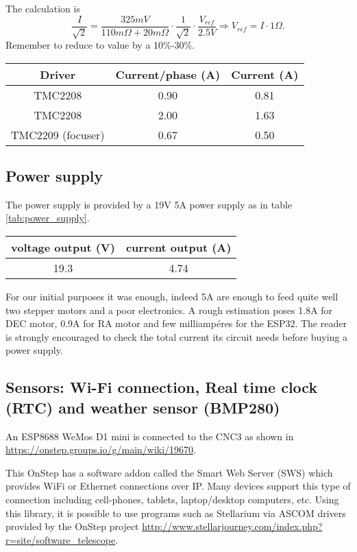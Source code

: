 The calculation is 
\[\frac{I}{\sqrt{2}}=\frac{325mV}{110m\Omega+20m\Omega}\cdot\frac{1}{\sqrt{2}}\cdot\frac{V_{ref}}{2.5V}\Rightarrow V_{ref} = I \cdot 1\Omega.\]
Remember to reduce to value by a 10\%-30\%.

\begin{minipage}
    {.4\textwidth}
    \begin{tabular}{ccc}
       Driver & Current/phase (A) & Current (A) \\
        \hline
       TMC2208 & 0.90 & 0.81 \\
       TMC2208 &  2.00 & 1.63 \\                
       TMC2209 (focuser) &  0.67 & 0.50                
    \end{tabular}
    \label{tab:drivers_curr}
\end{minipage} 

\subsection{Power supply}
The power supply is provided by a 19V 5A power supply as in table \ref{tab:power_supply}.

\begin{minipage}
    {.4\textwidth}
    \begin{tabular}{cc}
         voltage output (V) & current output (A) \\
         \hline
        19.3 & 4.74 \\
    \end{tabular}
    \label{tab:power_supply}
\end{minipage}

For our initial purposes it was enough, indeed 5A are enough to feed quite well two stepper motors and a poor electronics.
A rough estimation poses 1.8A for DEC motor, 0.9A for RA motor and few milliampéres for the ESP32. 
The reader is strongly encouraged to check the total current its circuit needs before buying a power supply.

\subsection{Sensors: Wi-Fi connection, Real time clock (RTC) and weather sensor (BMP280)}
An ESP8688 WeMos D1 mini is connected to the CNC3 as shown in \url{https://onstep.groups.io/g/main/wiki/19670}.

This OnStep has a software addon called the Smart Web Server (SWS) which provides WiFi or Ethernet connections over IP.
Many devices support this type of connection including cell-phones, tablets, laptop/desktop computers, etc.
Using this library, it is possible to use programs such as Stellarium via ASCOM drivers provided by the OnStep project \url{http://www.stellarjourney.com/index.php?r=site/software_telescope}.